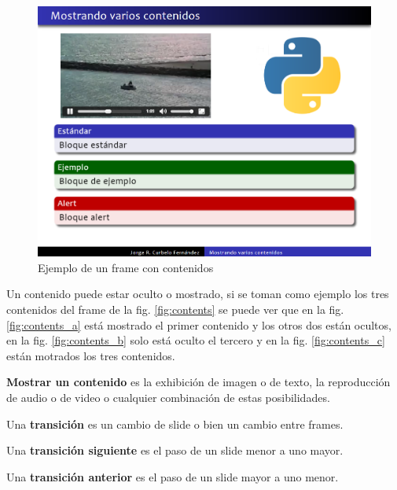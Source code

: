  		\begin{figure}[tb]
 			\centering
 			\includegraphics[width=12cm]{img/frame-video-image}
 			\caption{Ejemplo de un frame con contenidos}
 			\label{fig:frame_video_image}
 		\end{figure}

 		Un contenido puede estar oculto o mostrado, si se toman como ejemplo los tres contenidos del frame de la fig. \ref{fig:contents} se puede ver que en la fig. \ref{fig:contents_a} está mostrado el primer contenido y los otros dos están ocultos, en la fig. \ref{fig:contents_b} solo está oculto el tercero y en la fig. \ref{fig:contents_c} están motrados los tres contenidos.		

		\begin{definition}
		\label{def:show}
			\textbf{Mostrar un contenido} es la exhibición de imagen o de texto, la reproducción de audio o de video o cualquier combinación de estas posibilidades.
		\end{definition} 		


 		\begin{definition}
 		\label{def:transition}
 			Una \textbf{transición} es un cambio de slide o bien un cambio entre frames.
 		\end{definition}

 		\begin{definition}
 		\label{def:next_transition}
 			Una \textbf{transición siguiente} es el paso de un slide menor a uno mayor.
 		\end{definition} 		

 		\begin{definition}
 		\label{def:prev_transition}
 			Una \textbf{transición anterior} es el paso de un slide mayor a uno menor.
 		\end{definition}

